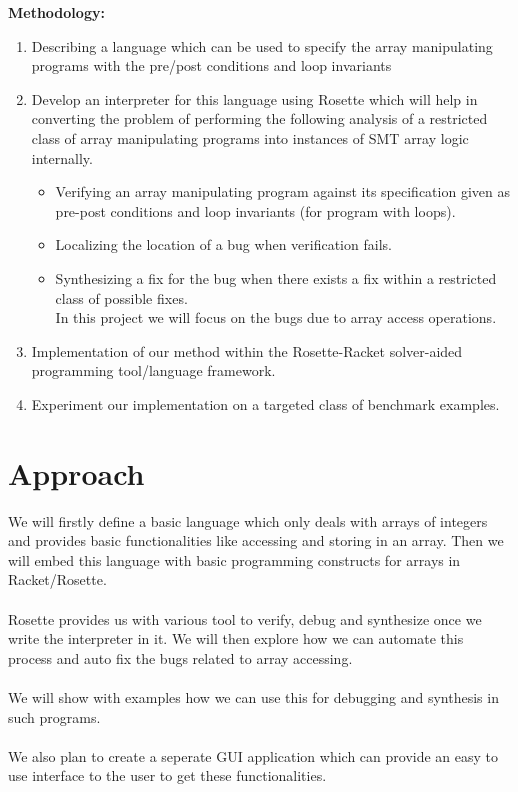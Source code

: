 \documentclass[a4paper, 12pt, notitlepage] {article}
\begin{document}
{\bf Methodology:}
\begin{enumerate}
	\item  Describing a language which can be used to specify the array manipulating programs with the pre/post conditions and loop invariants \\
	\item Develop an interpreter for this language using Rosette which will help in converting the problem of performing the following analysis of a restricted class of array manipulating programs into instances of SMT array logic internally.
	\begin{itemize}
		\item Verifying an array manipulating program against its specification given as pre-post conditions and loop invariants (for program with loops).
		\item Localizing the location of a bug when verification fails.
		\item Synthesizing a fix for the bug when there exists a fix within a restricted class of possible fixes.\\
		In this project we will focus on the bugs due to array access operations.
	\end{itemize}
	
	\item Implementation of our method within the Rosette-Racket solver-aided programming tool/language framework.\
	
	\item Experiment our implementation on a targeted class of benchmark examples.
\end{enumerate}

\section {Approach}
We will firstly define a basic language which only deals with arrays of integers and provides basic functionalities like accessing and storing in an array. Then we will embed this language with basic programming constructs for arrays in Racket/Rosette.\\
\\
Rosette provides us with various tool to verify, debug and synthesize once we write the interpreter in it. We will then explore how we can automate this process and auto fix the bugs related to array accessing.
\\
\\
We will show with examples how we can use this for debugging and synthesis in such programs.\\
\\
We also plan to create a seperate GUI application which can provide an easy to use interface to the user to get these functionalities. 
\end{document}
